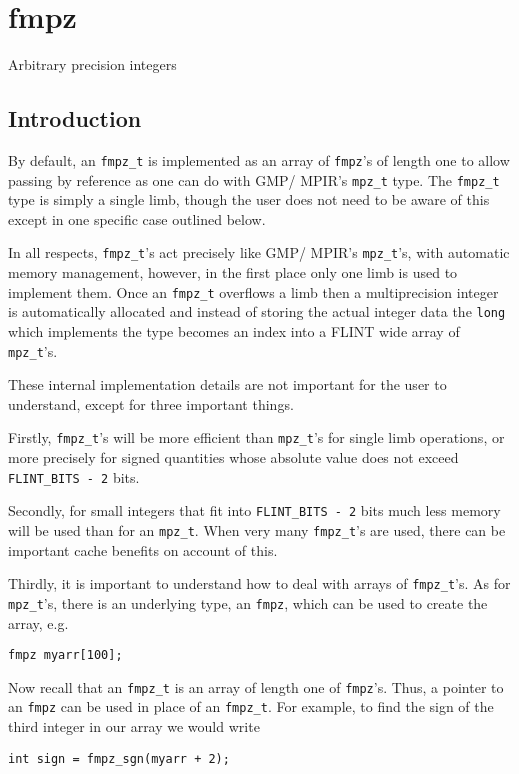 \documentclass[a4paper,10pt]{book}
\newcommand{\code}{\lstinline}
\begin{document}

\chapter{fmpz}
\epigraph{Arbitrary precision integers}{}

\section{Introduction}

By default, an \code{fmpz_t} is implemented as an array of \code{fmpz}'s of 
length one to allow passing by reference as one can do with GMP/ MPIR's 
\code{mpz_t} type.  The \code{fmpz_t} type is simply a single limb, though 
the user does not need to be aware of this except in one specific case 
outlined below.

In all respects, \code{fmpz_t}'s act precisely like GMP/ MPIR's 
\code{mpz_t}'s, with automatic memory management, however, in the first 
place only one limb is used to implement them.  Once an \code{fmpz_t} 
overflows a limb then a multiprecision integer is automatically allocated 
and instead of storing the actual integer data the \code{long} which 
implements the type becomes an index into a FLINT wide array of 
\code{mpz_t}'s.

These internal implementation details are not important for the user to 
understand, except for three important things.

Firstly, \code{fmpz_t}'s will be more efficient than \code{mpz_t}'s for 
single limb operations, or more precisely for signed quantities whose 
absolute value does not exceed \code{FLINT_BITS - 2} bits.

Secondly, for small integers that fit into \code{FLINT_BITS - 2} bits 
much less memory will be used than for an \code{mpz_t}.  When very many 
\code{fmpz_t}'s are used, there can be important cache benefits on 
account of this.

Thirdly, it is important to understand how to deal with arrays of 
\code{fmpz_t}'s.  As for \code{mpz_t}'s, there is an underlying type, 
an \code{fmpz}, which can be used to create the array, e.g.\ 
\begin{lstlisting}
fmpz myarr[100];
\end{lstlisting}
Now recall that an \code{fmpz_t} is an array of length one of \code{fmpz}'s.
Thus, a pointer to an \code{fmpz} can be used in place of an \code{fmpz_t}.
For example, to find the sign of the third integer in our array we would 
write 
\begin{lstlisting}
int sign = fmpz_sgn(myarr + 2);
\end{lstlisting}
\end{document}

